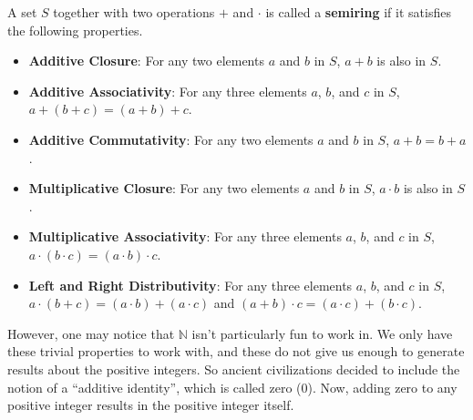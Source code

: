 \newpage

\begin{definition}
    A set $S$ together with two operations $+$ and $\cdot$ is called a \textbf{semiring} if it satisfies the following properties.
    \begin{itemize}
        \item \textbf{Additive Closure}: For any two elements $a$ and $b$ in $S$, $a + b$ is also in $S$.
        \item \textbf{Additive Associativity}: For any three elements $a$, $b$, and $c$ in $S$, $a+(b+c) = (a+b)+c$.
        \item \textbf{Additive Commutativity}: For any two elements $a$ and $b$ in $S$, $a + b = b + a$.
        \item \textbf{Multiplicative Closure}: For any two elements $a$ and $b$ in $S$, $a \cdot b$ is also in $S$.
        \item \textbf{Multiplicative Associativity}: For any three elements $a$, $b$, and $c$ in $S$, $a\cdot(b\cdot c) = (a\cdot b)\cdot c$.
        \item \textbf{Left and Right Distributivity}: For any three elements $a$, $b$, and $c$ in $S$, $a\cdot(b + c) = (a \cdot b) + (a \cdot c)$ and $(a + b) \cdot c = (a \cdot c) + (b \cdot c)$.
    \end{itemize}
\end{definition}

However, one may notice that $\mathbb{N}$ isn't particularly fun to work in. We only have these trivial properties to work with, and these do not give us enough to generate results about the positive integers. So ancient civilizations decided to include the notion of a ``additive identity'', which is called zero (0). Now, adding zero to any positive integer results in the positive integer itself.

